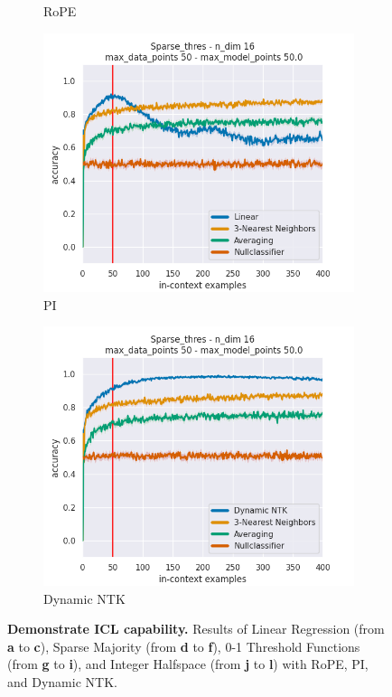 \documentclass[letterpaper]{article} %
\begin{document}
\begin{figure}[tp]
\begin{subfigure}[t]{0.32\linewidth}
        \caption{RoPE}
    \end{subfigure}
    \begin{subfigure}[t]{0.32\linewidth}
        \includegraphics[width=\linewidth]{AnonymousSubmission/LaTeX/imgs/appendix/threshold/linear.png}
        \caption{PI}
    \end{subfigure}
    \begin{subfigure}[t]{0.32\linewidth}
        \includegraphics[width=\linewidth]{AnonymousSubmission/LaTeX/imgs/appendix/threshold/ntk.png}
        \caption{Dynamic NTK}
    \end{subfigure}
    \caption{\small\textbf{Demonstrate ICL capability.} Results of Linear Regression (from \textbf{a} to \textbf{c}), Sparse Majority (from \textbf{d} to \textbf{f}), 0-1 Threshold Functions (from \textbf{g} to \textbf{i}), and Integer Halfspace (from \textbf{j} to \textbf{l}) with RoPE, PI, and Dynamic NTK.}
    \label{fig:icl_appendix}
\end{figure}
\end{document}
